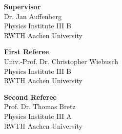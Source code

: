 \cleardoublepage

\vspace*{15.5cm}

\begin{flushleft}
	\textbf{Supervisor}\\
	Dr. Jan Auffenberg\\
	Physics Institute III B\\
	RWTH Aachen University\\
	\bigskip
	
	\textbf{First Referee}\\
	Univ.-Prof. Dr. Christopher Wiebusch\\
	Physics Institute III B\\
	RWTH Aachen University\\
	\bigskip
	
	\textbf{Second Referee}\\
	Prof. Dr. Thomas Bretz\\
	Physics Institute III A\\
	RWTH Aachen University
	
\end{flushleft}